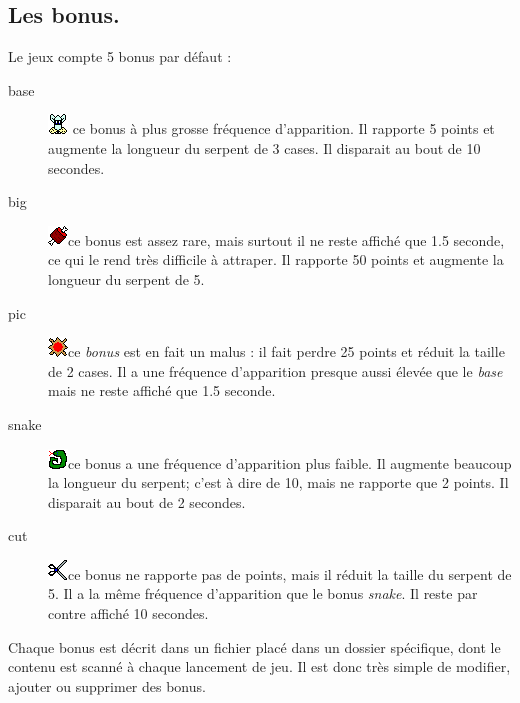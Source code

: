 \documentclass{article}
\begin{document}
\subsection{Les bonus.} \label{bonus}
Le jeux compte 5 bonus par défaut :\begin{description}
	\item[base] \includegraphics{img/base.png} ce bonus à plus grosse fréquence d'apparition. Il rapporte 5 points et augmente la longueur du serpent de 3 cases. Il disparait au bout de 10 secondes.
	\item[big]  \includegraphics{img/big.png}ce bonus est assez rare, mais surtout il ne reste affiché que 1.5 seconde, ce qui le rend très difficile à attraper. Il rapporte 50 points et augmente la longueur du serpent de 5.
	\item[pic]  \includegraphics{img/pic.png}ce \emph{bonus} est en fait un malus : il fait perdre 25 points et réduit la taille de 2 cases. Il a une fréquence d'apparition presque aussi élevée que le \emph{base} mais ne reste affiché que 1.5 seconde.
	\item[snake]  \includegraphics{img/snake.png}ce bonus a une fréquence d'apparition plus faible. Il augmente beaucoup la longueur du serpent; c'est à dire de 10, mais ne rapporte que 2 points. Il disparait au bout de 2 secondes.
	\item[cut]  \includegraphics{img/cut.png}ce bonus ne rapporte pas de points, mais il réduit la taille du serpent de 5. Il a la même fréquence d'apparition que le bonus \emph{snake}. Il reste par contre affiché 10 secondes.
\end{description}

Chaque bonus est décrit dans un fichier placé dans un dossier spécifique, dont le contenu est scanné à chaque lancement de jeu. Il est donc très simple de modifier, ajouter ou supprimer des bonus.
\end{document}
